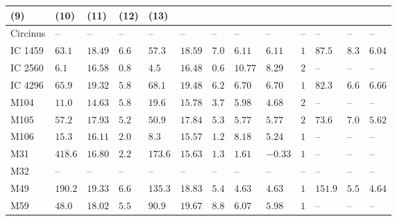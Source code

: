 \begin{table*}
\begin{center}
\begin{tabular}{lllllllllllll}
\multicolumn{1}{l}{(9)} &                             
\multicolumn{1}{l}{(10)} &                             
\multicolumn{1}{l}{(11)} &                             
\multicolumn{1}{l}{(12)} &                             
\multicolumn{1}{l}{(13)} \\                         
\hline                                                
Circinus   \quad &   -- &   -- &   -- \quad \quad &   -- &   -- &   -- &   -- &   -- \quad \quad & 
 -- \quad \quad & 
 -- &   -- &   --    \\ 
IC 1459  \quad &  $63.1$  &  $18.49$  &  $6.6$  \quad \quad &  $57.3$  &  $18.59$  &  $7.0$  &  $6.11$  &  $6.11$  \quad \quad &  $1$  \quad \quad &  $87.5$  &  $8.3$  &  $6.04$  \\ 
IC 2560  \quad &  $6.1$  &  $16.58$  &  $0.8$  \quad \quad &  $4.5$  &  $16.48$  &  $0.6$  &  $10.77$  &  $8.29$  \quad \quad &  $2$  \quad \quad &   -- &   -- &   --    \\ 
IC 4296  \quad &  $65.9$  &  $19.32$  &  $5.8$  \quad \quad &  $68.1$  &  $19.48$  &  $6.2$  &  $6.70$  &  $6.70$  \quad \quad &  $1$  \quad \quad &  $82.3$  &  $6.6$  &  $6.66$  \\ 
M104  \quad &  $11.0$  &  $14.63$  &  $5.8$  \quad \quad &  $19.6$  &  $15.78$  &  $3.7$  &  $5.98$  &  $4.68$  \quad \quad &  $2$  \quad \quad &   -- &   -- &   --    \\ 
M105  \quad &  $57.2$  &  $17.93$  &  $5.2$  \quad \quad &  $50.9$  &  $17.84$  &  $5.3$  &  $5.77$  &  $5.77$  \quad \quad &  $2$  \quad \quad &  $73.6$  &  $7.0$  &  $5.62$  \\ 
M106  \quad &  $15.3$  &  $16.11$  &  $2.0$  \quad \quad &  $8.3$  &  $15.57$  &  $1.2$  &  $8.18$  &  $5.24$  \quad \quad &  $1$  \quad \quad &   -- &   -- &   --    \\ 
M31  \quad &  $418.6$  &  $16.80$  &  $2.2$  \quad \quad &  $173.6$  &  $15.63$  &  $1.3$  &  $1.61$  &  $-0.33$  \quad \quad &  $1$  \quad \quad &   -- &   -- &   --    \\ 
M32  \quad &   -- &   -- &   -- \quad \quad &   -- &   -- &   -- &   -- &   -- \quad \quad & 
 -- \quad \quad & 
 -- &   -- &   --    \\ 
M49  \quad &  $190.2$  &  $19.33$  &  $6.6$  \quad \quad &  $135.3$  &  $18.83$  &  $5.4$  &  $4.63$  &  $4.63$  \quad \quad &  $1$  \quad \quad &  $151.9$  &  $5.5$  &  $4.64$  \\ 
M59  \quad &  $48.0$  &  $18.02$  &  $5.5$  \quad \quad &  $90.9$  &  $19.67$  &  $8.8$  &  $6.07$  &  $5.98$  \quad \quad &  $1$  \quad \quad &   -- &   -- &   --    \\ 

\end{tabular}
\end{center}
\end{table*}
